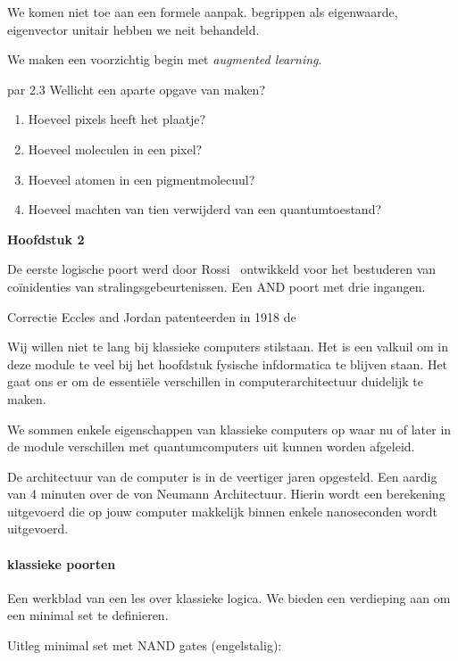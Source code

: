 \documentclass[../../main.tex]{subfiles}
\begin{document}
We komen niet toe aan een formele aanpak.  begrippen als eigenwaarde, eigenvector unitair hebben we neit behandeld.
 
We maken een voorzichtig begin met \textit{augmented learning}. 


par 2.3
Wellicht een aparte opgave van maken?
\begin{enumerate}
\item Hoeveel pixels heeft het plaatje?
\item Hoeveel moleculen in een pixel?
\item Hoeveel atomen in een pigmentmolecuul? 
\item Hoeveel machten van tien verwijderd van een quantumtoestand?
\end{enumerate}

\textbf{Hoofdstuk 2}

De eerste logische poort werd door Rossi~\cite{rossi1930method} ontwikkeld voor het bestuderen van co\"inidenties van stralingsgebeurtenissen. Een AND poort met drie ingangen.

Correctie Eccles and Jordan patenteerden in 1918 de  

Wij willen niet te lang bij klassieke computers stilstaan. Het is een valkuil om in deze module te veel bij het hoofdstuk fysische infdormatica te blijven staan. Het gaat ons er om de essenti\"ele verschillen  in computerarchitectuur duidelijk te maken. 

We sommen enkele eigenschappen van klassieke computers op waar nu of later in de module verschillen met quantumcomputers uit kunnen worden afgeleid. 

De architectuur van de computer is in de veertiger jaren opgesteld.
Een aardig  van 4 minuten over de von Neumann Architectuur. Hierin wordt een berekening uitgevoerd die op jouw computer makkelijk binnen enkele nanoseconden wordt uitgevoerd.

\paragraph{klassieke poorten}
Een werkblad van een les over klassieke logica. We bieden een verdieping aan om een minimal set te definieren.


Uitleg minimal set met NAND gates (engelstalig):
\end{document}
